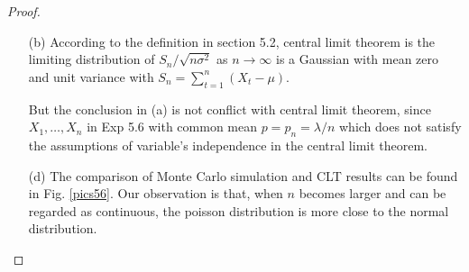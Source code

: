 \begin{proof}
\begin{enumerate}
		Then, we just need to proof the coefficient of possion is 1.
		\begin{equation}
		\begin{aligned}
		\notag
		&\ell_{h=\infty} \underbrace{\frac{n !}{(n-x) !} \frac{1}{n^{x}}}_{h \rightarrow \infty}=1 . \\
		&\frac{n(n-1)(n-2) \cdots(n-x+1)}{n}=1 .
		\end{aligned}
		\end{equation}
		Thus, 
		\begin{equation} 
		\notag
		\lim _{n \rightarrow \infty} P_{n}(x)=e^{-\lambda} \lambda^{x} /(x !)
		\end{equation}
	\item [(b)]
		According to the definition in section 5.2, central limit theorem is the limiting distribution of $S_{n} / \sqrt{n \sigma^{2}}$ as $n \rightarrow \infty$ is a Gaussian with mean zero and unit variance with $S_{n}=\sum_{t=1}^{n}\left(X_{t}-\mu \right)$. 
		
		But  the conclusion in (a) is not conflict with central limit theorem, since $X_1, \ldots, X_n$ in Exp 5.6 with common mean $p=p_{n}=\lambda / n$ which does not satisfy the assumptions of variable's independence in the central limit theorem.
	\item [(d)] The comparison of Monte Carlo simulation and CLT results can be found in Fig. \ref{pics56}.
		Our observation is that, when $n$ becomes larger and can be regarded as continuous, the poisson distribution is more close to the normal distribution.
\end {enumerate}
\end{proof}











